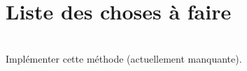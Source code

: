 \chapter{Liste des choses à faire }
\hypertarget{todo}{}\label{todo}

\begin{DoxyRefList}
\item[{\parbox[t]{\linewidth}{Global(e) \doxylink{class_annonce_dao_a014608133310cd84762bb4555aa4beb2}{Annonce\+Dao::\+modifier} (\doxylink{class_annonce}{Annonce} \$annonce)}}]\hfill \\
\label{todo__todo000001}%
%
Implémenter cette méthode (actuellement manquante). 
\end{DoxyRefList}